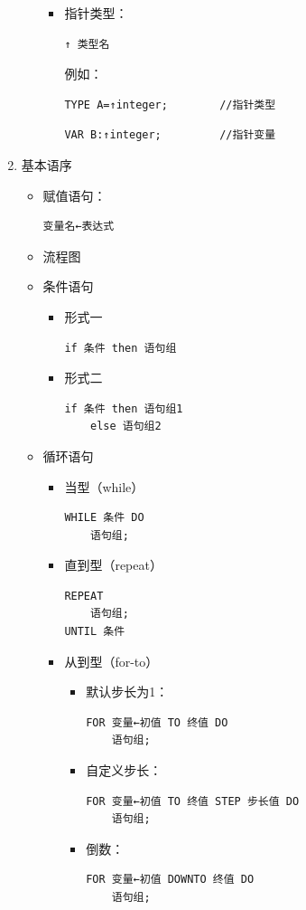 \documentclass[AutoFakeBold]{LZUThesis2007}
\begin{document}
\begin{enumerate}
\begin{itemize}
\begin{itemize}
\begin{itemize}
											\end{itemize}
										\item 指针类型：
\begin{lstlisting}
↑ 类型名
\end{lstlisting}
例如：
\begin{lstlisting}
TYPE A=↑integer;		//指针类型
\end{lstlisting}
\begin{lstlisting}
VAR B:↑integer;			//指针变量
\end{lstlisting}

									\end{itemize}

						\end{itemize}
				\item 基本语序
					\begin{itemize}
						\item 赋值语句：
\begin{lstlisting}
变量名←表达式
\end{lstlisting}
						\item 流程图
						\item 条件语句
							\begin{itemize}
								\item 形式一
\begin{lstlisting}
if 条件 then 语句组
\end{lstlisting}
								\item 形式二
\begin{lstlisting}
if 条件 then 语句组1
	else 语句组2
\end{lstlisting}
							\end{itemize}
						\item 循环语句
							\begin{itemize}
								\item 当型（while）
\begin{lstlisting}
WHILE 条件 DO
	语句组;
\end{lstlisting}
								\item 直到型（repeat）
\begin{lstlisting}
REPEAT
	语句组;
UNTIL 条件
\end{lstlisting}
								\item 从到型（for-to）
									\begin{itemize}
										\item 默认步长为1：
\begin{lstlisting}
FOR 变量←初值 TO 终值 DO
	语句组;
\end{lstlisting}
										\item 自定义步长：
\begin{lstlisting}
FOR 变量←初值 TO 终值 STEP 步长值 DO
	语句组;
\end{lstlisting}
										\item 倒数：
\begin{lstlisting}
FOR 变量←初值 DOWNTO 终值 DO
	语句组;
\end{lstlisting}
									\end{itemize}


\end{itemize}
\end{itemize}
\end{enumerate}
\end{document}
